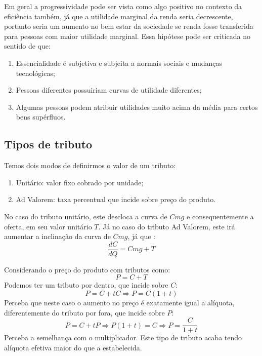 \documentclass[12pt,a4paper,oneside,brazil]{abntex2}
\begin{document}
Em geral a progressividade pode ser vista como algo positivo no contexto da eficiência também, já que a utilidade marginal da renda seria decrescente, portanto seria um aumento no bem estar da sociedade se renda fosse transferida para pessoas com maior utilidade marginal. Essa hipótese pode ser criticada no sentido de que:
\begin{enumerate}
\item Essencialidade é subjetiva e subjeita a normais sociais e mudanças tecnológicas;
\item Pessoas diferentes possuiriam curvas de utilidade diferentes;
\item Algumas pessoas podem atribuir utilidades muito acima da média para certos bens supérfluos.
\end{enumerate}

\subsection{Tipos de tributo}
Temos dois modos de definirmos o valor de um tributo:
\begin{enumerate}
\item Unitário: valor fixo cobrado por unidade;
\item Ad Valorem: taxa percentual que incide sobre preço do produto.
\end{enumerate}

No caso do tributo unitário, este descloca a curva de $Cmg$ e consequentemente a oferta, em seu valor unitário $T$. Já no caso do tributo Ad Valorem, este irá aumentar a inclinação da curva de $Cmg$, já que :
\[ \frac{d C}{d Q} = Cmg + T \]

Considerando o preço do produto com tributos como:
\[ P = C + T\]
Podemos ter um tributo por dentro, que incide sobre $C$:
\[ P = C + t C \Rightarrow P = C ( 1 + t) \]
Perceba que neste caso o aumento no preço é exatamente igual a alíquota, diferentemente do tributo por fora, que incide sobre $P$:
\[ P = C + t P \Rightarrow P ( 1 + t ) = C \Rightarrow P = \frac{C}{1 + t}\]
Perceba a semelhança com o multiplicador. Este tipo de tributo acaba tendo alíquota efetiva maior do que a estabelecida. 


\printbibliography
\end{document}
